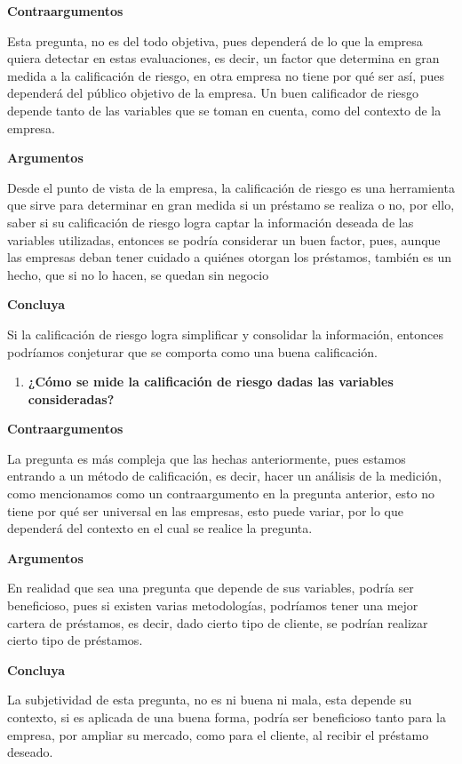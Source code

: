 \documentclass[
  letterpaper,
  DIV=11,
  numbers=noendperiod]{scrreprt}
\providecommand{\tightlist}{%
  \setlength{\itemsep}{0pt}\setlength{\parskip}{0pt}}\usepackage{longtable,booktabs,array}
\begin{document}
\textbf{Contraargumentos}

Esta pregunta, no es del todo objetiva, pues dependerá de lo que la
empresa quiera detectar en estas evaluaciones, es decir, un factor que
determina en gran medida a la calificación de riesgo, en otra empresa no
tiene por qué ser así, pues dependerá del público objetivo de la
empresa. Un buen calificador de riesgo depende tanto de las variables
que se toman en cuenta, como del contexto de la empresa.

\textbf{Argumentos}

Desde el punto de vista de la empresa, la calificación de riesgo es una
herramienta que sirve para determinar en gran medida si un préstamo se
realiza o no, por ello, saber si su calificación de riesgo logra captar
la información deseada de las variables utilizadas, entonces se podría
considerar un buen factor, pues, aunque las empresas deban tener cuidado
a quiénes otorgan los préstamos, también es un hecho, que si no lo
hacen, se quedan sin negocio

\textbf{Concluya}

Si la calificación de riesgo logra simplificar y consolidar la
información, entonces podríamos conjeturar que se comporta como una
buena calificación.

\begin{enumerate}
\def\labelenumi{\arabic{enumi}.}
\setcounter{enumi}{3}
\tightlist
\item
  \textbf{¿Cómo se mide la calificación de riesgo dadas las variables
  consideradas?}
\end{enumerate}

\textbf{Contraargumentos}

La pregunta es más compleja que las hechas anteriormente, pues estamos
entrando a un método de calificación, es decir, hacer un análisis de la
medición, como mencionamos como un contraargumento en la pregunta
anterior, esto no tiene por qué ser universal en las empresas, esto
puede variar, por lo que dependerá del contexto en el cual se realice la
pregunta.

\textbf{Argumentos}

En realidad que sea una pregunta que depende de sus variables, podría
ser beneficioso, pues si existen varias metodologías, podríamos tener
una mejor cartera de préstamos, es decir, dado cierto tipo de cliente,
se podrían realizar cierto tipo de préstamos.

\textbf{Concluya}

La subjetividad de esta pregunta, no es ni buena ni mala, esta depende
su contexto, si es aplicada de una buena forma, podría ser beneficioso
tanto para la empresa, por ampliar su mercado, como para el cliente, al
recibir el préstamo deseado.
\end{document}

